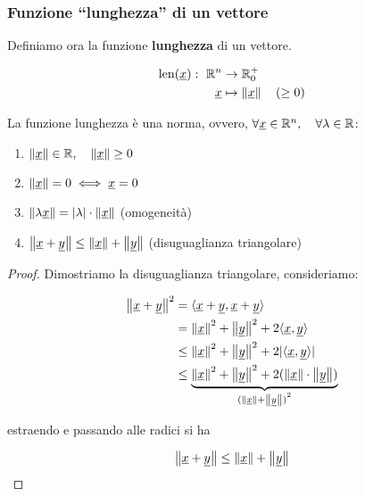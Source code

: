 \filbreak{}

\subsubsection{Funzione ``lunghezza'' di un vettore}

Definiamo ora la funzione \textbf{lunghezza} di un vettore.

\begin{align*}
    \text{len}(\ux): \ \Rn & \rightarrow \R_0^{+}            \\
    \ux                    & \mapsto \norm\ux \quad (\geq 0)
\end{align*}

La funzione lunghezza è una norma, ovvero, \(\forall \ux \in \Rn , \quad \forall \lambda \in \R \):

\begin{enumerate}
    \item \(\norm\ux \in \R, \quad \norm\ux \geq 0\)
    \item \(\norm\ux = 0 \iff \ux = 0\)
    \item \(\norm{\lambda \ux} = |\lambda| \cdot \norm\ux \) \hfill (omogeneità)
    \item \(\norm{\ux+\uy} \leq \norm\ux + \norm\uy \) \hfill (disuguaglianza triangolare)
\end{enumerate}


\begin{proof}
    Dimostriamo la disuguaglianza triangolare, consideriamo:

    \begin{align*}
        \norm{\ux+\uy}^{2} & = \prods{\ux+\uy}{\ux+\uy}                                                                             \\
                           & = \norm\ux^{2}+\norm\uy^{2} + 2 \prods{\ux}{\uy}                                                       \\
                           & \le \norm\ux^{2} + \norm\uy ^{2} + 2|\prods{\ux}{\uy}|                                                 \\
                           & \le \underbrace{\norm\ux ^{2} + \norm\uy^{2} + 2(\norm\ux \cdot \norm\uy)}_{{(\norm\ux+\norm\uy)}^{2}}
    \end{align*}

    estraendo e passando alle radici si ha

    \[
        \norm{\ux+\uy} \le \norm\ux+\norm\uy
    \]
\end{proof}

